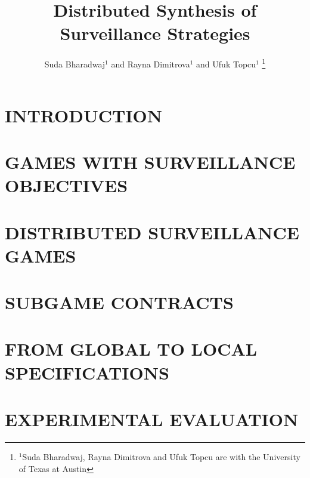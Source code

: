 \documentclass[letterpaper, 10 pt, conference]{ieeeconf}  %
\title{\LARGE \bf Distributed Synthesis of Surveillance Strategies}
\author{Suda Bharadwaj$^{1}$ and Rayna Dimitrova$^{1}$ and Ufuk Topcu$^{1}$%
\thanks{$^{1}$Suda Bharadwaj, Rayna Dimitrova and Ufuk Topcu are with the University of Texas at Austin}%
}
\begin{document}
\maketitle
\thispagestyle{empty}
\pagestyle{empty}


\begin{abstract}

\end{abstract}


\section{INTRODUCTION}




\section{GAMES WITH SURVEILLANCE OBJECTIVES}





\section{DISTRIBUTED SURVEILLANCE GAMES}


\section{SUBGAME CONTRACTS}


\section{FROM GLOBAL TO LOCAL SPECIFICATIONS}


\section{EXPERIMENTAL EVALUATION}\label{sec:experiments}
\end{document}
